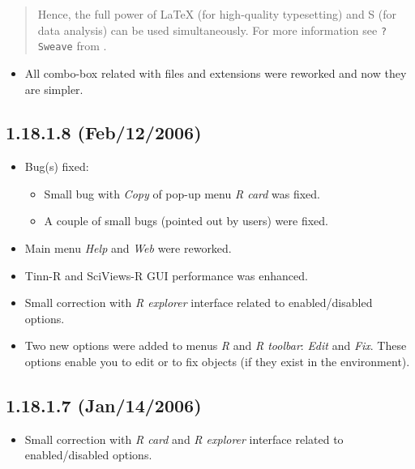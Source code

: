 \begin{footnotesize}
  \begin{quotation}
    Hence, the full power of LaTeX (for high-quality typesetting) and S (for data
    analysis) can be used simultaneously. For more information see \texttt{?Sweave}
    from \RR{}.
  \end{quotation}
\end{footnotesize}

\begin{itemize}
  \item All combo-box related with files and extensions were reworked
    and now they are simpler.
\end{itemize}


\subsection{1.18.1.8 (Feb/12/2006)}

\begin{itemize}
  \item Bug(s) fixed:
    \begin{itemize}
      \item Small bug with \textit{Copy} of pop-up menu \textit{R card}
        was fixed.
      \item A couple of small bugs (pointed out by users) were fixed.
    \end{itemize}
  \item Main menu \textit{Help} and \textit{Web} were reworked.
  \item Tinn-R and SciViews-R GUI performance was enhanced.
  \item Small correction with \textit{R explorer} interface
    related to enabled/disabled options.
  \item Two new options were added to menus \textit{R} and \textit{R toolbar}:
    \textit{Edit} and \textit{Fix}. These options enable
    you to edit or to fix \RR{} objects (if they exist in the \RR{}
    environment).
\end{itemize}


\subsection{1.18.1.7 (Jan/14/2006)}

\begin{itemize}
  \item Small correction with \textit{R card} and \textit{R explorer}
    interface related to enabled/disabled options.
\end{itemize}


